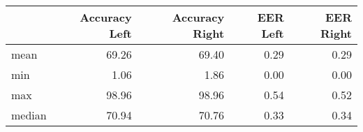 \begin{tabular}{lrrrr}
\toprule
{} &  Accuracy Left &  Accuracy Right &  EER Left &  EER Right \\
\midrule
mean   &          69.26 &           69.40 &      0.29 &       0.29 \\
min    &           1.06 &            1.86 &      0.00 &       0.00 \\
max    &          98.96 &           98.96 &      0.54 &       0.52 \\
median &          70.94 &           70.76 &      0.33 &       0.34 \\
\bottomrule
\end{tabular}
